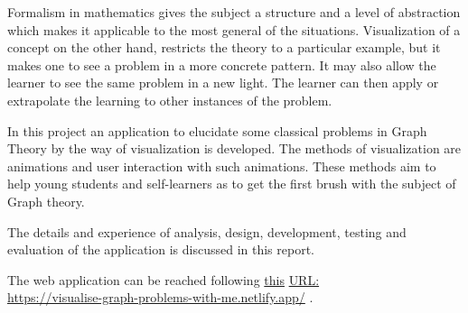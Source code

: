 Formalism in mathematics gives the subject a structure and a level of
abstraction which makes it applicable to the most general of the situations.
Visualization of a concept on the other hand, restricts the theory to a
particular example, but it makes one to see a problem in a more concrete
pattern. It may also allow the learner to see the same problem in a new light. The
learner can then apply or extrapolate the learning to other instances of the problem. 

In this project an application to elucidate some classical problems in Graph
Theory by the way of visualization is developed. The methods of visualization
are animations and user interaction with such animations. These methods aim to help young students and self-learners as to get the first brush with the subject of Graph theory.

The details and experience of analysis, design, development, testing and
evaluation of the application is discussed in this report.

The web application can be reached following
\href{https://visualise-graph-problems-with-me.netlify.app/} {this} 
\href{https://visualise-graph-problems-with-me.netlify.app/} {URL:} \\
\href{https://visualise-graph-problems-with-me.netlify.app/} {https://visualise-graph-problems-with-me.netlify.app/}
.
